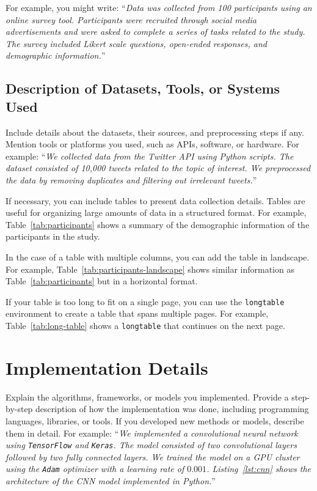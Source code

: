 For example, you might write: ``\textit{Data was collected from 100 participants using an online survey tool. Participants were recruited through social media advertisements and were asked to complete a series of tasks related to the study. The survey included Likert scale questions, open-ended responses, and demographic information.}''

\subsection{Description of Datasets, Tools, or Systems Used}\label{subsec:datasets-tools}
Include details about the datasets, their sources, and preprocessing steps if any. Mention tools or platforms you used, such as APIs, software, or hardware. For example: ``\textit{We collected data from the Twitter API using Python scripts. The dataset consisted of 10,000 tweets related to the topic of interest. We preprocessed the data by removing duplicates and filtering out irrelevant tweets.}''

If necessary, you can include tables to present data collection details. Tables are useful for organizing large amounts of data in a structured format. For example, Table~\ref{tab:participants} shows a summary of the demographic information of the participants in the study.


In the case of a table with multiple columns, you can add the table in landscape. For example, Table~\ref{tab:participants-landscape} shows similar information as Table~\ref{tab:participants} but in a horizontal format.


If your table is too long to fit on a single page, you can use the \texttt{longtable} environment to create a table that spans multiple pages. For example, Table~\ref{tab:long-table} shows a \texttt{longtable} that continues on the next page.


\section{Implementation Details}\label{sec:implementation-details}
Explain the algorithms, frameworks, or models you implemented. Provide a step-by-step description of how the implementation was done, including programming languages, libraries, or tools. If you developed new methods or models, describe them in detail. For example: ``\textit{We implemented a convolutional neural network using \texttt{TensorFlow} and \texttt{Keras}. The model consisted of two convolutional layers followed by two fully connected layers. We trained the model on a GPU cluster using the \texttt{Adam} optimizer with a learning rate of $0.001$. Listing~\ref{lst:cnn} shows the architecture of the CNN model implemented in Python.}''


